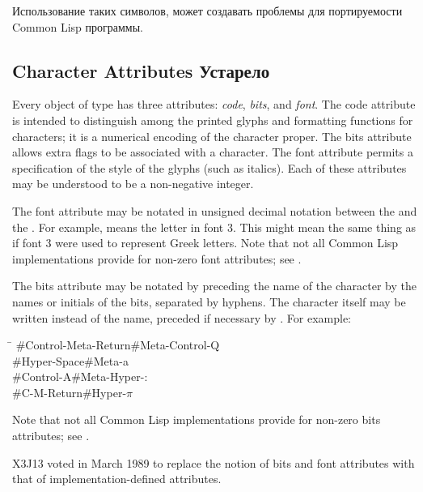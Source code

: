 Использование таких символов, может создавать проблемы для портируемости Common
Lisp программы.

\begin{obsolete}
\subsection{Character Attributes Устарело}
Every object of type 
has three attributes: {\it code}, {\it bits}, and {\it font}.
The code attribute is intended to distinguish among the printed glyphs
and formatting functions for characters; it is a numerical encoding
of the character proper.
The bits attribute allows extra
flags to be associated with a character.  The font attribute permits
a specification of the style of the glyphs (such as italics).
Each of these attributes may be understood to be a non-negative integer.

The font attribute may be notated in unsigned decimal notation
between the \cd{\#} and the \cd{{\Xbackslash}}.  For example,
 means the letter  in font 3.
This might mean the same thing as \cd{\#{\Xbackslash}$\alpha$} if font 3
were used to represent Greek letters.
Note that not all Common Lisp implementations provide for non-zero
font attributes; see .

The bits attribute may be notated
by preceding the name of the character by the names or initials
of the bits,
separated by hyphens.  The character itself may be written
instead of the name, preceded if necessary by \cd{{\Xbackslash}}.  For example:
\begin{lisp}
\textwidth\=\kill
\#{\Xbackslash}Control-Meta-Return\>\#{\Xbackslash}Meta-Control-Q \\
\#{\Xbackslash}Hyper-Space\>\#{\Xbackslash}Meta-{\Xbackslash}a \\
\#{\Xbackslash}Control-A\>\#{\Xbackslash}Meta-Hyper-{\Xbackslash}: \\
\#{\Xbackslash}C-M-Return\>\#{\Xbackslash}Hyper-{\Xbackslash}\(\pi\)
\end{lisp}
Note that not all Common Lisp implementations provide for non-zero
bits attributes; see .
\end{obsolete}

\begin{newer}
X3J13 voted in March 1989 
to replace the notion of bits and font attributes with
that of implementation-defined attributes.
\end{newer}

